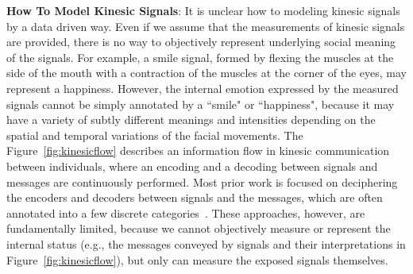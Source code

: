 \noindent \textbf{How To Model Kinesic Signals}: 
It is unclear how to modeling kinesic signals by a data driven way. Even if we assume that the measurements of kinesic signals are provided, there is no way to objectively represent underlying social meaning of the signals. For example, a smile signal, formed by flexing the muscles at the side of the mouth with a contraction of the muscles at the corner of the eyes, may represent a happiness. However, the internal emotion expressed by the measured signals cannot be simply annotated by a ``smile" or ``happiness", because it may have a variety of subtly different meanings and intensities depending on the spatial and temporal variations of the facial movements. The Figure~\ref{fig:kinesicflow} describes an information flow in kinesic communication between individuals, where an encoding and a decoding between signals and messages are continuously performed. Most prior work is focused on deciphering the encoders and decoders between signals and the messages, which are often annotated into a few discrete categories~\cite{pantic2000automatic,cowie2001emotion,shan2009facial,cowie2001emotion,gunes2006bimodal}. These approaches, however, are fundamentally limited, because we cannot objectively measure or represent the internal status (e.g., the messages conveyed by signals and their interpretations in Figure~\ref{fig:kinesicflow}), but only can measure the exposed signals themselves.




